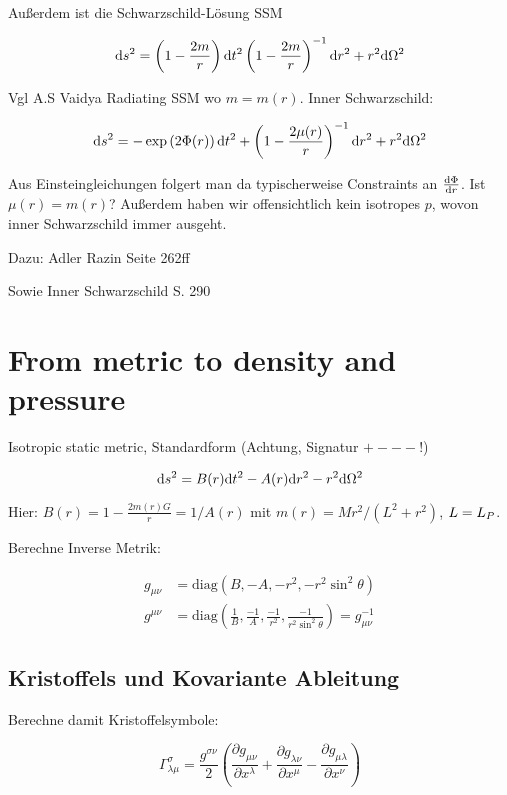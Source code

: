 \documentclass[12pt,a4paper]{article}
\begin{document}
Außerdem ist die Schwarzschild-Lösung SSM

\begin{equation}
\mathrm{d} s^2 = \left(  1 - \frac{2m}{r}  \right) \mathrm{d} t^2 \left(  1 - \frac{2m}{r}  \right)^{-1} \mathrm{d} r^2 + r^2 \mathrm{d} \Omega^2
\end{equation}

Vgl A.S Vaidya Radiating SSM wo $m=m(r)$. Inner Schwarzschild:

\begin{equation}
\mathrm{d} s^2 = - \exp \left( 2 \Phi(r) \right) \mathrm{d} t^2 + \left( 1 - \frac{2\mu(r)}{r} \right)^{-1} \mathrm{d} r^2 + r^2 \mathrm{d} \Omega^2 \label{SSMinner}
\end{equation}

Aus Einsteingleichungen folgert man da typischerweise Constraints an $\frac{\mathrm{d} \Phi}{\mathrm{d} r}$. Ist $\mu(r) = m(r)$? Außerdem haben wir offensichtlich kein isotropes $p$, wovon inner Schwarzschild immer ausgeht.

Dazu: Adler Razin Seite 262ff

Sowie Inner Schwarzschild S. 290

\section{From metric to density and pressure}

Isotropic static metric, Standardform (Achtung, Signatur $+---$!)

\begin{equation}
\mathrm{d} s^2 = B(r) \mathrm{d} t^2 - A(r) \mathrm{d} r^2 - r^2 \mathrm{d} \Omega^2
\end{equation}

Hier: $B(r) = 1 - \frac{2 m(r) G}{r} = 1 / A(r)$ mit $m(r) = M r^2 / (L^2 + r^2)$, $L = L_P$.

Berechne Inverse Metrik:

\begin{align}
g_{\mu \nu} &= \text{diag}(B, -A, -r^2, -r^2 \sin^2 \theta) \\
g^{\mu \nu} &= \text{diag}\left(\frac 1B, \frac{-1}A, \frac{-1}{r^2}, \frac{-1}{r^2\sin^2\theta}\right) = g_{\mu\nu}^{-1}
\end{align}

\subsection{Kristoffels und Kovariante Ableitung}
Berechne damit Kristoffelsymbole:

\begin{equation}
\Gamma^\sigma_{\lambda \mu} = \frac{g^{\sigma \nu}}2 \left( \frac{\partial g_{\mu \nu}}{\partial x^\lambda} + \frac{\partial g_{\lambda \nu}}{\partial x^\mu} - \frac{\partial g_{\mu\lambda}}{\partial x^\nu} \right)
\end{equation}
\end{document}
